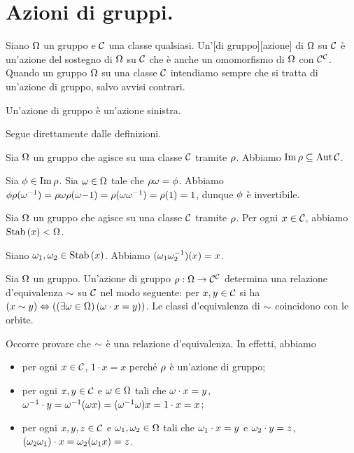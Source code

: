 \section{Azioni di gruppi.}\label{Azioni}
\begin{Definition}
	Siano $\Omega$ un gruppo e $\mathcal{C}$ una classe qualsiasi. Un'[di gruppo][azione] di $\Omega$ su $\mathcal{C}$ \`e un'azione del sostegno di $\Omega$ su $\mathcal{C}$ che \`e anche un omomorfismo di $\Omega$ con $\mathcal{C}^{\mathcal{C}}$. Quando un gruppo $\Omega$  su una classe $\mathcal{C}$ intendiamo sempre che si tratta di un'azione di gruppo, salvo avvisi contrari.
\end{Definition}
\begin{Theorem}
	Un'azione di gruppo \`e un'azione sinistra.
\end{Theorem}
\Proof Segue direttamente dalle definizioni. \EndProof
\begin{Theorem}
	Sia $\Omega$ un gruppo che agisce su una classe $\mathcal{C}$ tramite $\rho$. Abbiamo $\operatorname{Im}{\rho} \subseteq \operatorname{Aut}{\mathcal{C}}$.
\end{Theorem}
\Proof Sia $\phi \in \operatorname{Im}{\rho}$. Sia $\omega \in \Omega$ tale che $\rho{\omega} = \phi$. Abbiamo $\phi\rho(\omega^{-1}) = \rho{\omega}\rho(\omega{-1}) = \rho(\omega\omega^{-1}) = \rho(1) = 1$, dunque $\phi$ \`e invertibile. \EndProof
\begin{Theorem}
	Sia $\Omega$ un gruppo che agisce su una classe $\mathcal{C}$ tramite $\rho$. Per ogni $x \in \mathcal{C}$, abbiamo $\Stabilizer{x} \IsSubgroup \Operators$.
\end{Theorem}
\Proof Siano $\Operator_1, \Operator_2 \in \Stabilizer{x}$. Abbiamo $(\omega_1\omega_2^{-1})(x) = x$. \EndProof
\begin{Theorem}\label{action_equivalence}
	Sia $\Omega$ un gruppo. Un'azione di gruppo $\rho: \Omega \rightarrow \mathcal{C}^{\mathcal{C}}$ determina una relazione d'equivalenza $\Equivalence$ su $\mathcal{C}$ nel modo seguente: per $x, y \in \mathcal{C}$ si ha $\Coimplies{\Equivalence[x][y]}{\Exists{\Operator \in \Operators}{\Operator \cdot x = y}}$. Le classi d'equivalenza di $\Equivalence$ coincidono con le orbite.
\end{Theorem}
\Proof Occorre provare che $\Equivalence$ \`e una relazione d'equivalenza. In effetti, abbiamo
\begin{itemize}
	\item per ogni $x \in \mathcal{C}$, $1 \cdot x = x$ perch\'e $\rho$ \`e un'azione di gruppo;
	\item per ogni $x, y \in \mathcal{C}$ e $\omega \in \Omega$ tali che $\omega \cdot x = y$, $\omega^{-1} \cdot y = \omega^{-1} (\omega x) = (\omega^{-1} \omega) x = 1 \cdot x = x$;
	\item per ogni $x, y, z \in \mathcal{C}$ e $\omega_1, \omega_2 \in \Omega$ tali che $\omega_1 \cdot x = y$ e $\omega_2 \cdot y = z$, $(\omega_2\omega_1) \cdot x = \omega_2 (\omega_1 x) = z$.
\end{itemize}
